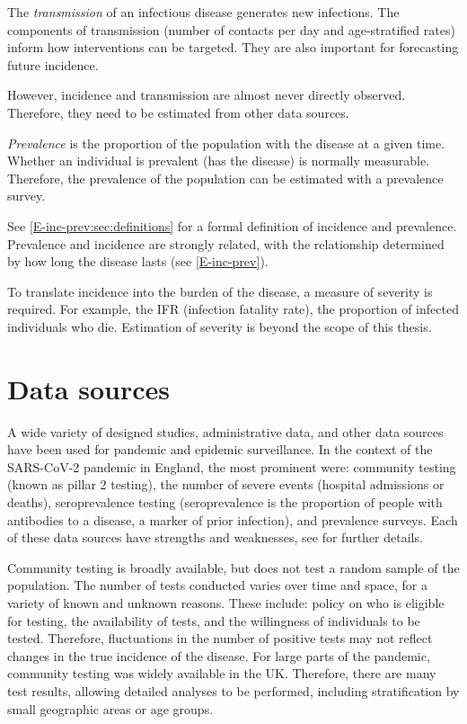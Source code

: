 \documentclass[thesis.tex]{subfiles}
\begin{document}
The \emph{transmission} of an infectious disease generates new infections.
The components of transmission (\eg number of contacts per day and age-stratified rates) inform how interventions can be targeted.
They are also important for forecasting future incidence.

However, incidence and transmission are almost never directly observed.
Therefore, they need to be estimated from other data sources.

\emph{Prevalence} is the proportion of the population with the disease at a given time.
Whether an individual is prevalent (has the disease) is normally measurable.
Therefore, the prevalence of the population can be estimated with a prevalence survey.

See \cref{E-inc-prev:sec:definitions} for a formal definition of incidence and prevalence.
Prevalence and incidence are strongly related, with the relationship determined by how long the disease lasts (see \cref{E-inc-prev}).

To translate incidence into the burden of the disease, a measure of severity is required.
For example, the IFR (infection fatality rate), the proportion of infected individuals who die.
Estimation of severity is beyond the scope of this thesis.

\section{Data sources} \label{intro:sec:data-sources}

A wide variety of designed studies, administrative data, and other data sources have been used for pandemic and epidemic surveillance.
In the context of the SARS-CoV-2 pandemic in England, the most prominent were: community testing (known as pillar 2 testing), the number of severe events (\eg hospital admissions or deaths), seroprevalence testing (seroprevalence is the proportion of people with antibodies to a disease, a marker of prior infection), and prevalence surveys.
Each of these data sources have strengths and weaknesses, see \textcite{royalSocietyRnumber} for further details.

Community testing is broadly available, but does not test a random sample of the population.
The number of tests conducted varies over time and space, for a variety of known and unknown reasons.
These include: policy on who is eligible for testing, the availability of tests, and the willingness of individuals to be tested.
Therefore, fluctuations in the number of positive tests may not reflect changes in the true incidence of the disease.
For large parts of the pandemic, community testing was widely available in the UK.
Therefore, there are many test results, allowing detailed analyses to be performed, including stratification by small geographic areas or age groups.
\end{document}
